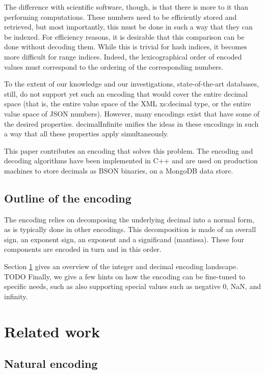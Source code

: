 \documentclass{acm_proc_article-sp}
\begin{document}
The difference with scientific software, though, is that there is more to it than performing computations. These numbers need to be efficiently stored and retrieved, but most importantly, this must be done in such a way that they can be indexed. For efficiency reasons, it is desirable that this comparison can be done without decoding them. While this is trivial for hash indices, it becomes more difficult for range indices. Indeed, the lexicographical order of encoded values must correspond to the ordering of the corresponding numbers.

To the extent of our knowledge and our investigations, state-of-the-art databases, still, do not support yet such an encoding that would cover the entire decimal space (that is, the entire value space of the XML xs:decimal type, or the entire value space of JSON numbers). However, many encodings exist that have some of the desired properties. decimalInfinite unifies the ideas in these encodings in such a way that all these properties apply simultaneously.

This paper contributes an encoding that solves this problem. The encoding and decoding algorithms have been implemented in C++ and are used on production machines to store decimals as BSON binaries, on a MongoDB data store.

\subsection{Outline of the encoding}

The encoding relies on decomposing the underlying decimal into a normal form, as is typically done in other encodings. This decomposition is made of an overall sign, an exponent sign, an exponent and a significand (mantissa). These four components are encoded in turn and in this order.

Section \ref{section-related-work} gives an overview of the integer and decimal encoding landscape.
TODO
Finally, we give a few hints on how the encoding can be fine-tuned to specific needs, such as also supporting special values such as negative 0, NaN, and infinity.

\section{Related work}
\label{section-related-work}

\subsection{Natural encoding}
\end{document}
